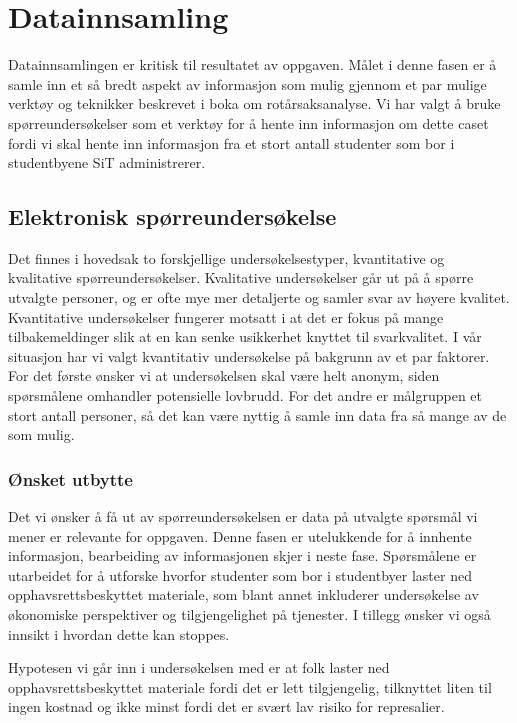 \chapter{Datainnsamling}
Datainnsamlingen er kritisk til resultatet av oppgaven. Målet i denne fasen er å samle inn et så bredt aspekt av informasjon som mulig gjennom et par mulige verktøy og teknikker beskrevet i boka om rotårsaksanalyse\cite{RCA}. Vi har valgt å bruke spørreundersøkelser som et verktøy for å hente inn informasjon om dette caset fordi vi skal hente inn informasjon fra et stort antall studenter som bor i studentbyene SiT administrerer.

\section{Elektronisk spørreundersøkelse}
Det finnes i hovedsak to forskjellige undersøkelsestyper, kvantitative og kvalitative spørreundersøkelser. Kvalitative undersøkelser går ut på å spørre utvalgte personer, og er ofte mye mer detaljerte og samler svar av høyere kvalitet. Kvantitative undersøkelser fungerer motsatt i at det er fokus på mange tilbakemeldinger slik at en kan senke usikkerhet knyttet til svarkvalitet. \cite{} I vår situasjon har vi valgt kvantitativ undersøkelse på bakgrunn av et par faktorer. For det første ønsker vi at undersøkelsen skal være helt anonym, siden spørsmålene omhandler potensielle lovbrudd. For det andre er målgruppen et stort antall personer, så det kan være nyttig å samle inn data fra så mange av de som mulig.

\subsection{Ønsket utbytte}
Det vi ønsker å få ut av spørreundersøkelsen er data på utvalgte spørsmål vi mener er relevante for oppgaven. Denne fasen er utelukkende for å innhente informasjon, bearbeiding av informasjonen skjer i neste fase. Spørsmålene er utarbeidet for å utforske hvorfor studenter som bor i studentbyer laster ned opphavsrettsbeskyttet materiale, som blant annet inkluderer undersøkelse av økonomiske perspektiver og tilgjengelighet på tjenester. I tillegg ønsker vi også innsikt i hvordan dette kan stoppes. 

Hypotesen vi går inn i undersøkelsen med er at folk laster ned opphavsrettsbeskyttet materiale fordi det er lett tilgjengelig, tilknyttet liten til ingen kostnad og ikke minst fordi det er svært lav risiko for represalier.

